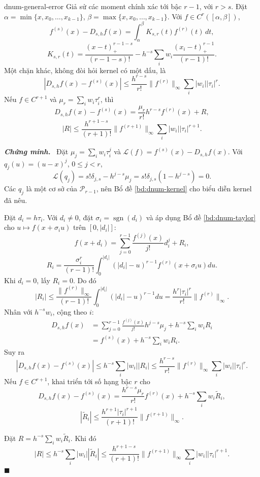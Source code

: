 \documentclass[12pt,a4paper,oneside]{book}
\numberwithin{algorithm}{chapter}
\theoremstyle{definition}
\newenvironment{chungminh}{\par\medskip\noindent\textbf{\textit{\color{mainblue}Chứng minh.}}\ }{\hfill$\blacksquare$\par\medskip}
\begin{document}
\begin{menhde}{}{dnum-general-error}
Giả sử các moment chính xác tới bậc $r-1$, với $r>s$. Đặt $\alpha=\min\{x,x_0,\ldots,x_{k-1}\}$, $\beta=\max\{x,x_0,\ldots,x_{k-1}\}$. Với $f\in C^r([\alpha,\beta])$,
\[
 f^{(s)}(x)-D_{s,h}f(x)=\int_\alpha^\beta K_{s,r}(t)f^{(r)}(t)\,dt,
\]
\[
 K_{s,r}(t)=\frac{(x-t)_+^{r-1-s}}{(r-1-s)!}
 -h^{-s}\sum_iw_i\frac{(x_i-t)_+^{r-1}}{(r-1)!}.
\]
Một chặn khác, không đòi hỏi kernel có một dấu, là
\begin{equation}\label{eq:dnum-truncation-bound}
 |D_{s,h}f(x)-f^{(s)}(x)|
 \leq\frac{h^{r-s}}{r!}\lVert f^{(r)}\rVert_\infty\sum_i|w_i||\tau_i|^r.
\end{equation}
Nếu $f\in C^{r+1}$ và $\mu_r=\sum_iw_i\tau_i^r$, thì
\[
 D_{s,h}f(x)-f^{(s)}(x)=\frac{\mu_r}{r!}h^{r-s}f^{(r)}(x)+R,
\]
\[
 |R|\leq\frac{h^{r+1-s}}{(r+1)!}\lVert f^{(r+1)}\rVert_\infty
 \sum_i|w_i||\tau_i|^{r+1}.
\]
\end{menhde}
\begin{chungminh}
Đặt $\mu_j=\sum_iw_i\tau_i^j$ và $\mathcal L(f)=f^{(s)}(x)-D_{s,h}f(x)$. Với $q_j(u)=(u-x)^j$, $0\leq j<r$,
\[
 \mathcal L(q_j)=s!\delta_{j,s}-h^{j-s}\mu_j
 =s!\delta_{j,s}(1-h^{j-s})=0.
\]
Các $q_j$ là một cơ sở của $\mathcal P_{r-1}$, nên Bổ đề \ref{bd:dnum-kernel} cho biểu diễn kernel đã nêu.

Đặt $d_i=h\tau_i$. Với $d_i\ne0$, đặt $\sigma_i=\operatorname{sgn}(d_i)$ và áp dụng Bổ đề \ref{bd:dnum-taylor} cho $u\mapsto f(x+\sigma_i u)$ trên $[0,|d_i|]$:
\[
 f(x+d_i)=\sum_{j=0}^{r-1}\frac{f^{(j)}(x)}{j!}d_i^j+R_i,
\]
\[
 R_i=\frac{\sigma_i^r}{(r-1)!}\int_0^{|d_i|}(|d_i|-u)^{r-1}f^{(r)}(x+\sigma_i u)du.
\]
Khi $d_i=0$, lấy $R_i=0$. Do đó
\[
 |R_i|\leq\frac{\|f^{(r)}\|_\infty}{(r-1)!}\int_0^{|d_i|}(|d_i|-u)^{r-1}du
 =\frac{h^r|\tau_i|^r}{r!}\|f^{(r)}\|_\infty.
\]
Nhân với $h^{-s}w_i$, cộng theo $i$:
\begin{align*}
 D_{s,h}f(x)&=\sum_{j=0}^{r-1}\frac{f^{(j)}(x)}{j!}h^{j-s}\mu_j+h^{-s}\sum_iw_iR_i\\
 &=f^{(s)}(x)+h^{-s}\sum_iw_iR_i.
\end{align*}
Suy ra
\[
 |D_{s,h}f(x)-f^{(s)}(x)|\leq h^{-s}\sum_i|w_i||R_i|
 \leq\frac{h^{r-s}}{r!}\|f^{(r)}\|_\infty\sum_i|w_i||\tau_i|^r.
\]
Nếu $f\in C^{r+1}$, khai triển tới số hạng bậc $r$ cho
\[
 D_{s,h}f(x)-f^{(s)}(x)
 =\frac{h^{r-s}\mu_r}{r!}f^{(r)}(x)+h^{-s}\sum_iw_i\widetilde R_i,
\]
\[
 |\widetilde R_i|\leq\frac{h^{r+1}|\tau_i|^{r+1}}{(r+1)!}\|f^{(r+1)}\|_\infty.
\]

Đặt $R=h^{-s}\sum_iw_i\widetilde R_i$. Khi đó
\[
 |R|\leq h^{-s}\sum_i|w_i||\widetilde R_i|
 \leq\frac{h^{r+1-s}}{(r+1)!}\|f^{(r+1)}\|_\infty\sum_i|w_i||\tau_i|^{r+1}.
\]
\end{chungminh}
\end{document}
